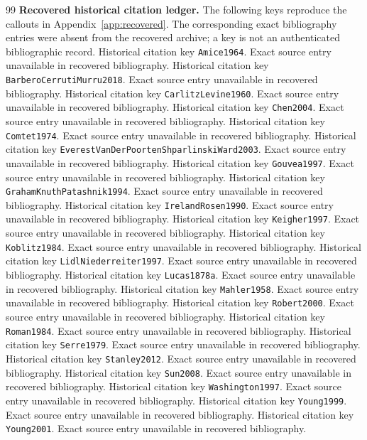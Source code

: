 \documentclass[11pt]{article}
\theoremstyle{definition}
\theoremstyle{remark}
\numberwithin{equation}{section}
\begin{document}
\begin{thebibliography}{99}
\medskip\noindent\textbf{Recovered historical citation ledger.}
The following keys reproduce the callouts in Appendix~\ref{app:recovered}.
The corresponding exact bibliography entries were absent from the recovered
archive; a key is not an authenticated bibliographic record.
 Historical citation key \nolinkurl{Amice1964}. Exact source entry unavailable in recovered bibliography.
 Historical citation key \nolinkurl{BarberoCerrutiMurru2018}. Exact source entry unavailable in recovered bibliography.
 Historical citation key \nolinkurl{CarlitzLevine1960}. Exact source entry unavailable in recovered bibliography.
 Historical citation key \nolinkurl{Chen2004}. Exact source entry unavailable in recovered bibliography.
 Historical citation key \nolinkurl{Comtet1974}. Exact source entry unavailable in recovered bibliography.
 Historical citation key \nolinkurl{EverestVanDerPoortenShparlinskiWard2003}. Exact source entry unavailable in recovered bibliography.
 Historical citation key \nolinkurl{Gouvea1997}. Exact source entry unavailable in recovered bibliography.
 Historical citation key \nolinkurl{GrahamKnuthPatashnik1994}. Exact source entry unavailable in recovered bibliography.
 Historical citation key \nolinkurl{IrelandRosen1990}. Exact source entry unavailable in recovered bibliography.
 Historical citation key \nolinkurl{Keigher1997}. Exact source entry unavailable in recovered bibliography.
 Historical citation key \nolinkurl{Koblitz1984}. Exact source entry unavailable in recovered bibliography.
 Historical citation key \nolinkurl{LidlNiederreiter1997}. Exact source entry unavailable in recovered bibliography.
 Historical citation key \nolinkurl{Lucas1878a}. Exact source entry unavailable in recovered bibliography.
 Historical citation key \nolinkurl{Mahler1958}. Exact source entry unavailable in recovered bibliography.
 Historical citation key \nolinkurl{Robert2000}. Exact source entry unavailable in recovered bibliography.
 Historical citation key \nolinkurl{Roman1984}. Exact source entry unavailable in recovered bibliography.
 Historical citation key \nolinkurl{Serre1979}. Exact source entry unavailable in recovered bibliography.
 Historical citation key \nolinkurl{Stanley2012}. Exact source entry unavailable in recovered bibliography.
 Historical citation key \nolinkurl{Sun2008}. Exact source entry unavailable in recovered bibliography.
 Historical citation key \nolinkurl{Washington1997}. Exact source entry unavailable in recovered bibliography.
 Historical citation key \nolinkurl{Young1999}. Exact source entry unavailable in recovered bibliography.
 Historical citation key \nolinkurl{Young2001}. Exact source entry unavailable in recovered bibliography.
\end{thebibliography}
\end{document}

